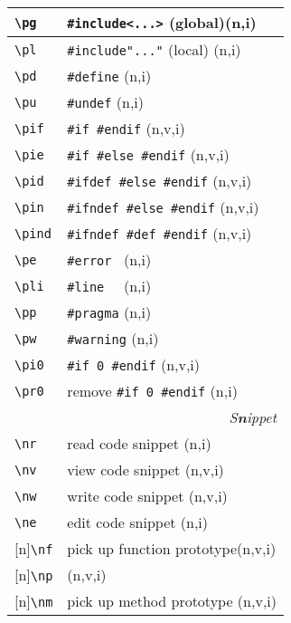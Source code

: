 \documentclass[oneside,11pt,landscape,DIV16]{scrartcl}
\newcommand{\Rep}{{\tiny{[n]}}}
\begin{document}
\begin{multicols}{3}
\begin{center}
\begin{tabular}[]{|p{11mm}|p{60mm}|}
\hline \verb'\pg'   & \verb$#include<...>$ (global)\hfill (n,i)\\
\hline \verb'\pl'   & \verb$#include"..."$ (local) \hfill (n,i)\\
\hline \verb'\pd'   & \verb'#define'               \hfill (n,i)\\
\hline \verb'\pu'   & \verb'#undef'                \hfill (n,i)\\
\hline \verb'\pif'  & \verb'#if #endif'            \hfill (n,v,i)\\
\hline \verb'\pie'  & \verb'#if #else #endif'      \hfill (n,v,i)\\
\hline \verb'\pid'  & \verb'#ifdef #else #endif'   \hfill (n,v,i)\\
\hline \verb'\pin'  & \verb'#ifndef #else #endif'  \hfill (n,v,i)\\
\hline \verb'\pind' & \verb'#ifndef #def #endif'   \hfill (n,v,i)\\
\hline \verb'\pe'   & \verb'#error '               \hfill (n,i)\\
\hline \verb'\pli'  & \verb'#line  '               \hfill (n,i)\\
\hline \verb'\pp'   & \verb'#pragma'               \hfill (n,i)\\
\hline \verb'\pw'   & \verb'#warning'              \hfill (n,i)\\
\hline \verb'\pi0'  & \verb'#if 0 #endif'          \hfill (n,v,i)\\
\hline \verb'\pr0'  & remove \verb'#if 0 #endif'   \hfill (n,i)\\
\hline
\hline 
\multicolumn{2}{|r|}{\textsl{S\textbf{n}ippet}} \\
\hline     \verb'\nr'  & read code snippet         \hfill (n,i)\\
\hline     \verb'\nv'  & view code snippet         \hfill (n,v,i)\\
\hline     \verb'\nw'  & write code snippet        \hfill (n,v,i)\\
\hline     \verb'\ne'  & edit code snippet         \hfill (n,i)\\
\hline \Rep\verb'\nf'  & pick up function prototype\hfill (n,v,i)\\
       \Rep\verb'\np'  &                           \hfill (n,v,i)\\
\hline \Rep\verb'\nm'  & pick up method prototype  \hfill (n,v,i)\\

\end{tabular}
\end{center}
\end{multicols}
\end{document}
